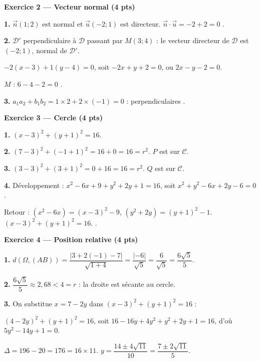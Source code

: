 \bigskip

\textbf{Exercice 2 — Vecteur normal (4 pts)}


\textbf{1.} $\vec{n}(1 ; 2)$ est normal et $\vec{u}(-2 ; 1)$ est directeur. $\vec{n} \cdot \vec{u} = -2 + 2 = 0$ \checkmark.

\textbf{2.} $\mathcal{D}'$ perpendiculaire à $\mathcal{D}$ passant par $M(3 ; 4)$ : le vecteur directeur de $\mathcal{D}$ est $(-2 ; 1)$, normal de $\mathcal{D}'$.

$-2(x-3) + 1(y-4) = 0$, soit $-2x + y + 2 = 0$, ou $2x - y - 2 = 0$.

$M$ : $6 - 4 - 2 = 0$ \checkmark.

\textbf{3.} $a_1 a_2 + b_1 b_2 = 1 \times 2 + 2 \times (-1) = 0$ : perpendiculaires \checkmark.

\bigskip

\textbf{Exercice 3 — Cercle (4 pts)}


\textbf{1.} $(x - 3)^2 + (y + 1)^2 = 16$.

\textbf{2.} $(7-3)^2 + (-1+1)^2 = 16 + 0 = 16 = r^2$. $P$ est sur $\mathcal{C}$.

\textbf{3.} $(3-3)^2 + (3+1)^2 = 0 + 16 = 16 = r^2$. $Q$ est sur $\mathcal{C}$.

\textbf{4.} Développement : $x^2 - 6x + 9 + y^2 + 2y + 1 = 16$, soit $x^2 + y^2 - 6x + 2y - 6 = 0$.

Retour : $(x^2-6x) = (x-3)^2 - 9$, $(y^2+2y) = (y+1)^2 - 1$. $(x-3)^2 + (y+1)^2 = 16$. \checkmark.

\bigskip

\textbf{Exercice 4 — Position relative (4 pts)}


\textbf{1.} $d(\Omega, (AB)) = \dfrac{|3 + 2(-1) - 7|}{\sqrt{1+4}} = \dfrac{|-6|}{\sqrt{5}} = \dfrac{6}{\sqrt{5}} = \dfrac{6\sqrt{5}}{5}$.

\textbf{2.} $\dfrac{6\sqrt{5}}{5} \approx 2{,}68 < 4 = r$ : la droite est sécante au cercle.

\textbf{3.} On substitue $x = 7 - 2y$ dans $(x-3)^2 + (y+1)^2 = 16$ :

$(4 - 2y)^2 + (y+1)^2 = 16$, soit $16 - 16y + 4y^2 + y^2 + 2y + 1 = 16$, d'où $5y^2 - 14y + 1 = 0$.

$\Delta = 196 - 20 = 176 = 16 \times 11$. $y = \dfrac{14 \pm 4\sqrt{11}}{10} = \dfrac{7 \pm 2\sqrt{11}}{5}$.


